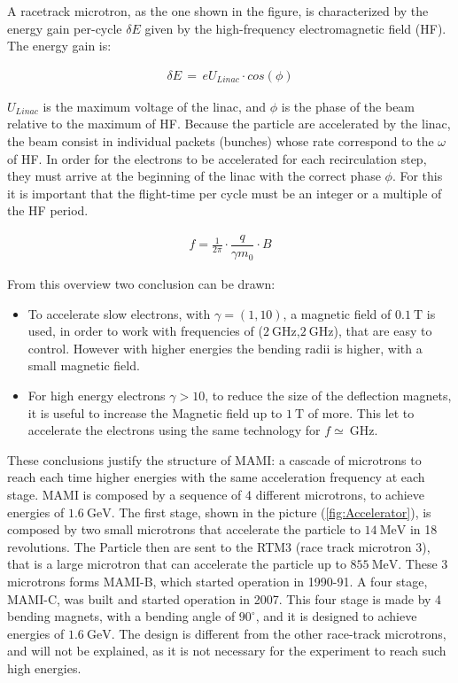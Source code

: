 A racetrack microtron, as the one shown in the figure, is characterized by the energy gain per-cycle $\delta E$ given by the high-frequency electromagnetic field (HF). The energy gain is: 

\begin{align*}
\delta E \, = \, e U_{Linac} \cdot cos(\phi)
\end{align*} 

$U_{Linac}$ is the maximum voltage of the linac, and $\phi$ is the phase of the beam relative to the maximum of HF. Because the particle are accelerated by the linac, the beam consist in individual packets (bunches) whose rate correspond to the $\omega$ of HF. In order for the electrons to be accelerated for each recirculation step, they must arrive at the beginning of the linac with the correct phase $\phi$. For this it is important that the flight-time per cycle must be an integer or a multiple of the HF period.

\begin{align*} \label{eq:frequency}
f = \frac{1}{2 \pi} \cdot \dfrac{q}{\gamma m_{0}} \cdot B
\end{align*}

From this overview two conclusion can be drawn:
\begin{itemize}
\item To accelerate slow electrons, with $\gamma = (1,10)$, a magnetic field of $\SI{0.1}{\tesla}$ is used, in order to work with frequencies of ($\SI{2}{\giga \hertz}$,$\SI{2}{\giga \hertz}$), that are easy to control. However with higher energies the bending radii is higher, with a small magnetic field.
\item For high energy electrons $\gamma > 10$, to reduce the size of the deflection magnets, it is useful to increase the Magnetic field up to $\SI{1}{\tesla}$ of more. This let to accelerate the electrons using the same technology for $f \simeq \SI{}{\giga \hertz}$.
\end{itemize}

These conclusions justify the structure of MAMI: a cascade of microtrons to reach each time higher energies with the same acceleration frequency at each stage. \medskip
MAMI is composed by a sequence of 4 different microtrons, to achieve energies of $\SI{1.6}{\giga \electronvolt}$. The first stage, shown in the picture (\ref{fig:Accelerator}), is composed by two small microtrons that accelerate the particle to $\SI{14}{\mega \electronvolt}$ in 18 revolutions. The Particle then are sent to the RTM3 (race track microtron 3), that is a large microtron that can accelerate the particle up to $\SI{855}{\mega \electronvolt}$. These 3 microtrons forms MAMI-B, which started operation in 1990-91. A four stage, MAMI-C, was built and started operation in 2007. This four stage is made by 4 bending magnets, with a bending angle of $90^{\circ}$, and it is designed to achieve energies of $\SI{1.6}{\giga \electronvolt}$. The design is different from the other race-track microtrons, and will not be explained, as it is not necessary for the experiment to reach such high energies.

